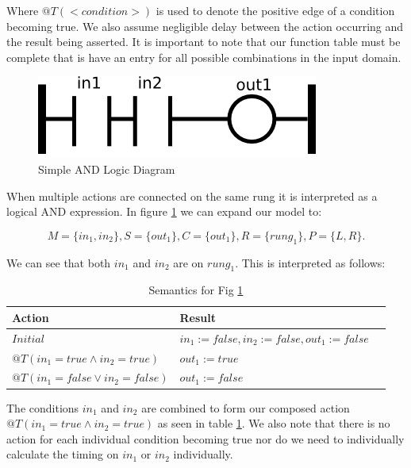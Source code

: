 Where $@T(<condition>)$ is used to denote the positive edge of a condition becoming true.
We also assume negligible delay between the action occurring and the result being asserted.
It is important to note that our function table must be complete that is have an entry for
all possible combinations in the input domain.

\begin{figure}[h]
    \centering
    \includegraphics[width=\imgsmall]{./images/intro_fig2.png}
    \caption{Simple AND Logic Diagram}
    \label{fig:intro_fig2}
\end{figure}

When multiple actions are connected on the same rung it is interpreted as a logical AND 
expression. In figure \ref{fig:intro_fig2} we can expand our model to:

$$M=\lbrace in_1, in_2 \rbrace, S=\lbrace out_1 \rbrace, C=\lbrace out_1 \rbrace, R=\lbrace rung_1 \rbrace, P=\lbrace L,R \rbrace.$$

We can see that both $in_1$ and $in_2$ are on $rung_1$. This is interpreted as follows:

\begin{table}[h]
    \centering
       \begin{tabular}{|l|l|l|}
        \hline
        Action & Result \\
        \hline
        $Initial$ & $in_1 := false, in_2 := false, out_1 := false$\\
        \hline
        $@T(in_1 = true \wedge in_2 = true)$ & $out_1 := true$ \\
        \hline
        $@T(in_1 = false \vee in_2 = false)$ & $out_1 := false$ \\
        \hline
    \end{tabular}
    \caption{Semantics for Fig \ref{fig:intro_fig2}}
    \label{table:table_for_fig2}
\end{table}

The conditions $in_1$ and $in_2$ are combined to form our composed action $@T(in_1 = true \wedge in_2 = true)$ 
as seen in table \ref{table:table_for_fig2}. We also note that there is no action for each individual condition
becoming true nor do we need to individually calculate the timing on $in_1$ or $in_2$ individually.

